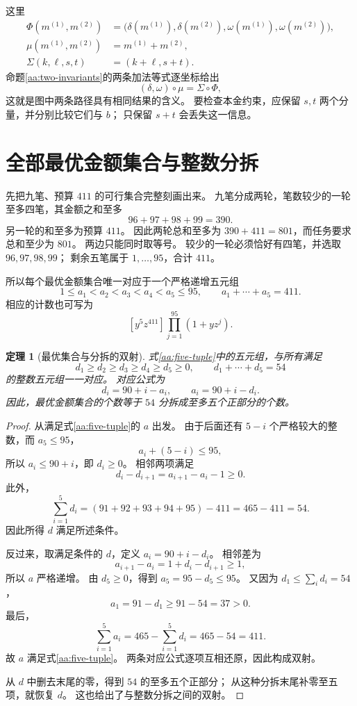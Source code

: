 \documentclass[UTF8,a4paper]{ctexbook}
\newtheorem{theorem}{定理}[chapter]
\theoremstyle{definition}
\numberwithin{equation}{chapter}
\newcommand{\1}{\mathbf{1}}
\begin{document}
这里
\[
\begin{aligned}
\Phi(m^{(1)},m^{(2)})
&=\bigl(\delta(m^{(1)}),\delta(m^{(2)}),
         \omega(m^{(1)}),\omega(m^{(2)})\bigr),\\
\mu(m^{(1)},m^{(2)})&=m^{(1)}+m^{(2)},\\
\Sigma(k,\ell,s,t)&=(k+\ell,s+t).
\end{aligned}
\]
命题\ref{aa:two-invariants}的两条加法等式逐坐标给出
\[
(\delta,\omega)\circ\mu=\Sigma\circ\Phi,
\]
这就是图中两条路径具有相同结果的含义。
要检查本金约束，应保留 \(s,t\) 两个分量，并分别比较它们与 \(b\)；
只保留 \(s+t\) 会丢失这一信息。

\section{全部最优金额集合与整数分拆}

先把九笔、预算 \(411\) 的可行集合完整刻画出来。
九笔分成两轮，笔数较少的一轮至多四笔，其金额之和至多
\[
96+97+98+99=390.
\]
另一轮的和至多为预算 \(411\)。
因此两轮总和至多为 \(390+411=801\)，而任务要求总和至少为 \(801\)。
两边只能同时取等号。
较少的一轮必须恰好有四笔，并选取 \(96,97,98,99\)；
剩余五笔属于 \(1,\ldots,95\)，合计 \(411\)。

所以每个最优金额集合唯一对应于一个严格递增五元组
\begin{equation}\label{aa:five-tuple}
1\le a_1<a_2<a_3<a_4<a_5\le95,
\qquad
a_1+\cdots+a_5=411.
\end{equation}
相应的计数也可写为
\[
[y^5z^{411}]\prod_{j=1}^{95}(1+yz^j).
\]

\begin{theorem}[最优集合与分拆的双射]\label{aa:partition-bijection}
式\eqref{aa:five-tuple}中的五元组，与所有满足
\[
d_1\ge d_2\ge d_3\ge d_4\ge d_5\ge0,
\qquad
d_1+\cdots+d_5=54
\]
的整数五元组一一对应。
对应公式为
\[
d_i=90+i-a_i,\qquad
a_i=90+i-d_i.
\]
因此，最优金额集合的个数等于 \(54\) 分拆成至多五个正部分的个数。
\end{theorem}

\begin{proof}
从满足式\eqref{aa:five-tuple}的 \(a\) 出发。
由于后面还有 \(5-i\) 个严格较大的整数，而 \(a_5\le95\)，
\[
a_i+(5-i)\le95,
\]
所以 \(a_i\le90+i\)，即 \(d_i\ge0\)。
相邻两项满足
\[
d_i-d_{i+1}=a_{i+1}-a_i-1\ge0.
\]
此外，
\[
\sum_{i=1}^{5}d_i
=(91+92+93+94+95)-411
=465-411=54.
\]
因此所得 \(d\) 满足所述条件。

反过来，取满足条件的 \(d\)，定义 \(a_i=90+i-d_i\)。
相邻差为
\[
a_{i+1}-a_i=1+d_i-d_{i+1}\ge1,
\]
所以 \(a\) 严格递增。
由 \(d_5\ge0\)，得到 \(a_5=95-d_5\le95\)。
又因为 \(d_1\le\sum_i d_i=54\)，
\[
a_1=91-d_1\ge91-54=37>0.
\]
最后，
\[
\sum_{i=1}^{5}a_i=465-\sum_{i=1}^{5}d_i=465-54=411.
\]
故 \(a\) 满足式\eqref{aa:five-tuple}。
两条对应公式逐项互相还原，因此构成双射。

从 \(d\) 中删去末尾的零，得到 \(54\) 的至多五个正部分；
从这种分拆末尾补零至五项，就恢复 \(d\)。
这也给出了与整数分拆之间的双射。
\end{proof}
\end{document}
